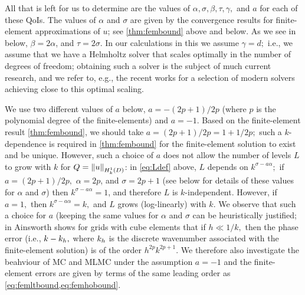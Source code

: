     All that is left for us to determine are the values of $\alpha, \sigma, \beta, \tau, \gamma,$ and $a$ for each of these QoIs. The values of $\alpha$ and $\sigma$ are given by the convergence results for finite-element approximations of $u$; see \cref{thm:fembound} above and  below. As we see in  below, $\beta = 2\alpha$, and $\tau = 2\sigma$. In our calculations in this  we assume $\gamma = d;$ i.e., we assume that we have a Helmholtz solver that scales optimally in the number of degrees of freedom; obtaining such a solver is the subject of much current research, and we refer to, e.g., the recent works \cite{GrSpVa:17,ZeScHeDe:18,TaZeHeDe:19} for a selection of modern solvers achieving close to this optimal scaling.

We use two different values of $a$ below, $a=-(2p+1)/2p$ (where $p$ is the polynomial degree of the finite-elements) and $a=-1$. Based on the finite-element result \cref{thm:fembound}, we should take $a=(2p+1)/2p = 1 + 1/2p;$ such a $k$-dependence is required in \cref{thm:fembound} for the finite-element solution to exist and be unique. However, such a choice of $a$ does not allow the number of levels $L$ to grow with $k$ for $Q = \NHokD{u}$: in \cref{eq:Ldef} above, $L$ depends on $k^{\sigma-a\alpha};$ if $a=(2p+1)/2p,$ $\alpha = 2p$, and $\sigma = 2p+1$ (see below for details of these values for $\alpha$ and $\sigma$) then $k^{\sigma-a\alpha} = 1$, and therefore $L$ is $k$-independent. However, if $a = 1,$ then $k^{\sigma-a\alpha} = k,$ and $L$ grows (log-linearly) with $k$. We observe that such a choice for $a$ (keeping the same values for $\alpha$ and $\sigma$ can be heuristically justified; in \cite[Theorem 3.2]{Ai:04} Ainsworth shows for grids with cube elements that if $h \ll 1/k,$ then the phase error (i.e., $k-k_{h},$ where $k_{h}$ is the discrete wavenumber associated with the finite-element solution) is of the order $h^{2p}k^{2p+1}$. We therefore also investigate the beahviour of MC and MLMC under the assumption $a=-1$ and the finite-element errors are given by terms of the same leading order as \cref{eq:femltbound,eq:femhobound}.

